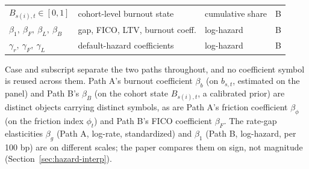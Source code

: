 \documentclass[12pt]{article}
\begin{document}
\begin{table}[H]
\begin{threeparttable}
\begin{tabular}{@{}lllc@{}}
$B_{s(i),t}\in[0,1]$ & cohort-level burnout state & cumulative share & B \\
$\beta_1,\ \beta_F,\ \beta_L,\ \beta_B$ & gap, FICO, LTV, burnout coeff. & log-hazard & B \\
$\gamma_r,\ \gamma_F,\ \gamma_L$ & default-hazard coefficients & log-hazard & B \\
\bottomrule
\end{tabular}
\begin{tablenotes}[flushleft]\scriptsize
\item Case and subscript separate the two paths throughout, and no coefficient symbol is reused across them. Path A's burnout coefficient $\beta_b$ (on $b_{s,t}$, estimated on the panel) and Path B's $\beta_B$ (on the cohort state $B_{s(i),t}$, a calibrated prior) are distinct objects carrying distinct symbols, as are Path A's friction coefficient $\beta_\phi$ (on the friction index $\phi_t$) and Path B's FICO coefficient $\beta_F$. The rate-gap elasticities $\beta_g$ (Path A, log-rate, standardized) and $\beta_1$ (Path B, log-hazard, per 100 bp) are on different scales; the paper compares them on sign, not magnitude (Section~\ref{sec:hazard-interp}).
\end{tablenotes}
\end{threeparttable}
\end{table}
\end{document}
